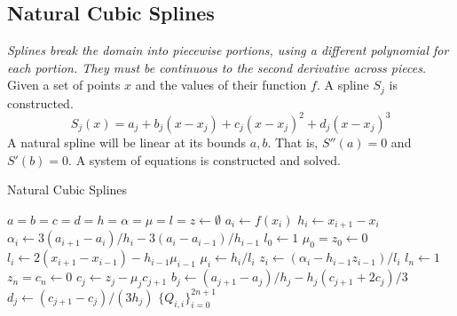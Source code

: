 \documentclass[12pt]{article}
\numberwithin{equation}{subsection}
\begin{document}
        \subsection{Natural Cubic Splines}

            \textit{Splines break the domain into piecewise portions, using
            a different polynomial for each portion. They must be continuous
            to the second derivative across pieces.}\\

            Given a set of points $x$ and the values of their function $f$. A
            spline $S_j$ is constructed.
            $$S_j(x) = a_j + b_j(x-x_j) + c_j(x-x_j)^2 + d_j(x-x_j)^3$$
            A natural spline will be linear at its bounds $a, b$. That is,
            $S''(a) = 0$ and $S'(b) = 0$. A system of equations is constructed
            and solved.

            \begin{center}
            \begin{algorithm}[H]
                \caption{Natural Cubic Splines}
                \begin{algorithmic}[1]
                    \State $a = b = c = d = h = \alpha = \mu = l = z \gets \emptyset$
                        \State $a_i \gets f(x_i)$
                    \EndFor
                        \State $h_i \gets x_{i+1} - x_i$
                    \EndFor
                        \State $\alpha_i \gets 3(a_{i+1}-a_i)/h_i- 3(a_i-a_{i-1})/h_{i-1}$
                    \EndFor
                    \State $l_0 \gets 1$
                    \State $\mu_0 = z_0 \gets 0$
                        \State $l_i \gets 2(x_{i+1}-x_{i-1}) - h_{i-1}\mu_{i-1}$
                        \State $\mu_i \gets h_i/l_i$
                        \State $z_i \gets (\alpha_i - h_{i-1}z_{i-1})/l_i$
                    \EndFor
                    \State $l_n \gets 1$
                    \State $z_n = c_n \gets 0$
                        \State $c_j \gets z_j - \mu_j c_{j+1}$
                        \State $b_j \gets (a_{j+1}-a_j)/h_j-h_j(c_{j+1}+2c_j)/3$
                        \State $d_j \gets (c_{j+1}-c_j)/(3h_j) $
                    \EndFor
                    \State \Return $\{Q_{i,i}\}_{i=0}^{2n+1}$
                    \EndProcedure
                \end{algorithmic}
            \end{algorithm}
            \end{center}
\end{document}
